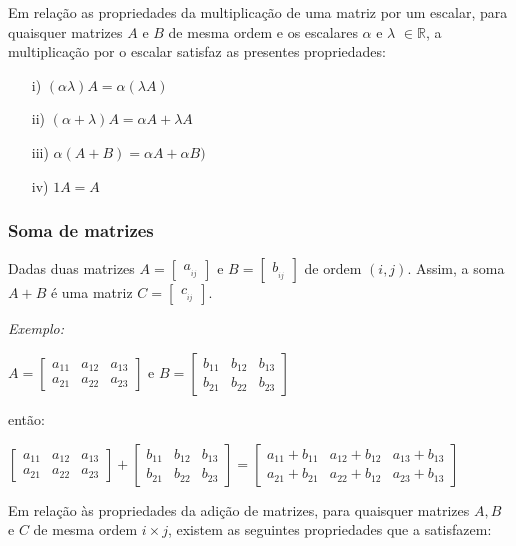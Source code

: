 Em relação as propriedades da multiplicação de uma matriz por um escalar, para quaisquer matrizes $A$ e $B$ de mesma ordem e os escalares $\alpha$ e $\lambda$ $\in \mathbb{R}$, a multiplicação por o escalar satisfaz as presentes propriedades:
\begin{enumerate}
    \item[i)] $(\alpha \lambda) A = \alpha(\lambda A)$
    \item[ii)] $(\alpha + \lambda) A = \alpha A + \lambda A$
    \item[iii)] $\alpha(A + B) = \alpha A + \alpha B)$
    \item[iv)] $1 A = A$
\end{enumerate}
 
\subsubsection{Soma de matrizes}
\noindent Dadas duas matrizes  $A = \begin{bmatrix} a_{}_{ij} \end{bmatrix}$ e  $B = \begin{bmatrix} b_{}_{ij} \end{bmatrix}$ de ordem $(i, j)$. Assim, a soma $A + B$ é uma matriz  $C = \begin{bmatrix} c_{}_{ij} \end{bmatrix}$.

\textit{Exemplo:}
\begin{center}
    $A =
    \begin{bmatrix}
        a{}_{11} & a{}_{12} & a{}_{13} \\ 
        a{}_{21} & a{}_{22} & a{}_{23} 
    \end{bmatrix}
    $
    e
    $B =
    \begin{bmatrix}
        b{}_{11} & b{}_{12} & b{}_{13} \\ 
        b{}_{21} & b{}_{22} & b{}_{23}
    \end{bmatrix}$
\end{center}

então:

\begin{center}
    $
    \begin{bmatrix}
        a{}_{11} & a{}_{12} & a{}_{13} \\ 
        a{}_{21} & a{}_{22} & a{}_{23} 
    \end{bmatrix}
    +
    \begin{bmatrix}
        b{}_{11} & b{}_{12} & b{}_{13} \\ 
        b{}_{21} & b{}_{22} & b{}_{23}
    \end{bmatrix}
    =
    \begin{bmatrix}
        a{}_{11} + b{}_{11} & a{}_{12} + b{}_{12} & a{}_{13} + b{}_{13} \\ 
        a{}_{21} + b{}_{21} & a{}_{22} + b{}_{12} & a{}_{23} + b{}_{13}
    \end{bmatrix}$
\end{center}
Em relação às propriedades da adição de matrizes, para quaisquer matrizes $A, B$ e $C$ de mesma ordem $i \times j$, existem as seguintes propriedades que a satisfazem:

